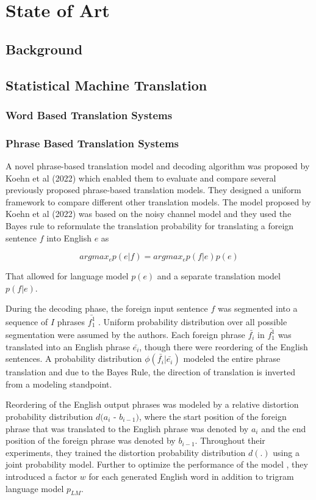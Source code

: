 \chapter{State of Art}
\section{Background}
\section{Statistical Machine Translation}
\subsection{Word Based Translation Systems}
\subsection{Phrase Based Translation Systems}
A novel phrase-based translation model and decoding algorithm was proposed by Koehn et al (2022) which enabled them to evaluate and compare several previously proposed phrase-based translation models. They designed a uniform framework to compare different other translation models. The model proposed by Koehn et al (2022) was based on the noisy channel model and they used the Bayes rule to reformulate the translation probability for translating a foreign sentence $f$ into English $e$ as

$$
argmax_ep(e|f)= argmax_ep(f|e)p(e)
$$

That allowed for language model $p(e)$ and a separate translation model $p(f|e)$.

During the decoding phase, the foreign input sentence $f$ was segmented into a sequence of $I$ phrases $\bar{f_1^1}$ . Uniform probability distribution over all possible segmentation were assumed by the authors. Each foreign phrase $\bar{f_i}$ in $\bar{f_1^1}$ was translated into an English phrase $\bar{e_i}$, though there were reordering of the English sentences. A probability distribution $\phi(\bar{f_i}|\bar{e_i})$ modeled the entire phrase translation and due to the Bayes Rule, the direction of translation is inverted from a modeling standpoint. 

Reordering of the English output phrases was modeled by a relative distortion probability distribution $d(a_i$ - $b_{i-1})$, where the start position of the foreign phrase that was translated to the English phrase was denoted by $a_i$ and the end position of the foreign phrase was denoted by $b_{i-1}$. Throughout their experiments, they trained the distortion probability distribution $d (.)$ using a joint probability model. Further to optimize the performance of the model , they introduced a factor $w$ for each generated English word in addition to trigram language model $p_{LM}$. 

